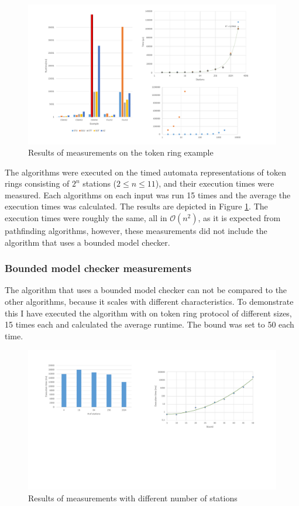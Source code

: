 \begin{figure}
	\centering
	\includegraphics[width=\textwidth]{include/figures/diag_tokenfddi}
	\caption{Results of measurements on the token ring example}
	\label{fig:tokendiag}
\end{figure}

The algorithms were executed on the timed automata representations of token rings consisting of $2^n$ stations ($2 \leq n \leq 11$), and their execution times were measured. Each algorithms on each input was run 15 times and the average the execution times was calculated. The results are depicted in Figure \ref{fig:tokendiag}. The execution times were roughly the same, all in $\mathcal{O}(n^2)$, as it is expected from pathfinding algorithms, however, these measurements did not include the algorithm that uses a bounded model checker.

\subsubsection{Bounded model checker measurements}

The algorithm that uses a bounded model checker can not be compared to the other algorithms, because it scales with different characteristics. To demonstrate this I have executed the algorithm with on token ring protocol of different sizes, 15 times each and calculated the average runtime. The bound was set to 50 each time.

\begin{figure}
	\centering
	\includegraphics[width=\textwidth]{include/figures/diag_bound_station}
	\caption{Results of measurements with different number of stations}
	\label{fig:tokenboundstations}
\end{figure}

